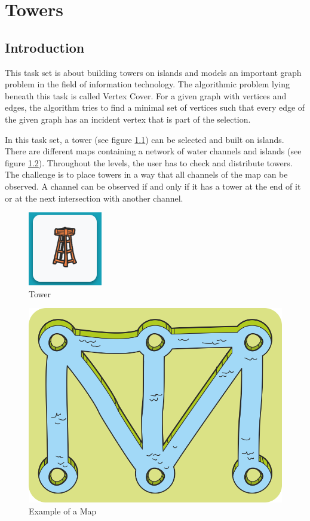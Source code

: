 \chapter{Towers}
\label{chapter:towers}

\section{Introduction}
\label{section:introduction}
This task set is about building towers on islands and models an important graph problem in the field of information technology. The algorithmic problem lying beneath this task is called Vertex Cover. For a given graph with vertices and edges, the algorithm tries to find a minimal set of vertices such that every edge of the given graph has an incident vertex that is part of the selection.

In this task set, a tower (see figure \ref{fig:tower}) can be selected and built on islands. There are different maps containing a network of water channels and islands (see figure \ref{fig:map}).
Throughout the levels, the user has to check and distribute towers. The challenge is to place towers in a way that all channels of the map can be observed. A channel can be observed if and only if it has a tower at the end of it or at the next intersection with another channel.

\begin{figure}[H]
    \centering
    \includegraphics[width=0.2 \columnwidth]{figures/tower.png}
    \caption{Tower} 
    \label{fig:tower} 
\end{figure}

\begin{figure}[H]
    \centering
    \includegraphics[width=1.0 \columnwidth]{figures/map_example.png}
    \caption{Example of a Map} 
    \label{fig:map} 
\end{figure}


